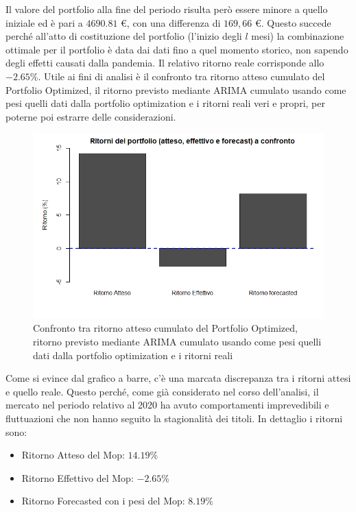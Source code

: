 \documentclass[12pt]{article}
\begin{document}
\FloatBarrier
Il valore del portfolio alla fine del periodo risulta però essere minore a quello iniziale ed è pari a $4690.81$ €, con una differenza di $169,66$ €. Questo succede perché all'atto di costituzione del portfolio (l'inizio degli $l$ mesi) la combinazione ottimale per il portfolio è data dai dati fino a quel momento storico, non sapendo degli effetti causati dalla pandemia. Il relativo ritorno reale corrisponde allo $-2.65\%$. Utile ai fini di analisi è il confronto tra ritorno atteso cumulato del Portfolio Optimized, il ritorno previsto mediante ARIMA cumulato usando come pesi quelli dati dalla portfolio optimization e i ritorni reali veri e propri, per poterne poi estrarre delle considerazioni.
\begin{figure}[!htb]
    \centering
    \includegraphics[width=1\textwidth]{immagini/confr.png}
    \caption{Confronto tra ritorno atteso cumulato del Portfolio Optimized, ritorno previsto mediante ARIMA cumulato usando come pesi quelli dati dalla portfolio optimization e i ritorni reali}
\end{figure}
\FloatBarrier
Come si evince dal grafico a barre, c'è una marcata discrepanza tra i ritorni attesi e quello reale. Questo perché, come già considerato nel corso dell'analisi, il mercato nel periodo relativo al 2020 ha avuto comportamenti imprevedibili e fluttuazioni che non hanno seguito la stagionalità dei titoli. In dettaglio i ritorni sono:
\begin{itemize}
    \item Ritorno Atteso del Mop: $14.19\%$
    \item Ritorno Effettivo del Mop: $-2.65\%$
    \item Ritorno Forecasted con i pesi del Mop: $8.19\%$
\end{itemize}
\newpage
\end{document}
